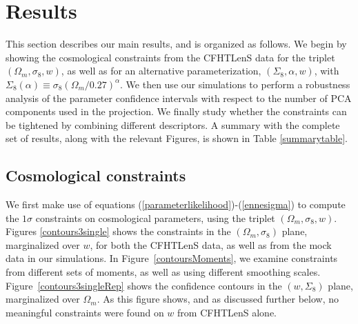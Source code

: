 \documentclass[reprint,aps,prd,superscriptaddress,showkeys,showpacs]{revtex4-1}
\begin{document}
\section{Results}
\label{results}

This section describes our main results, and is organized as follows.
We begin by showing the cosmological constraints from the CFHTLenS
data for the triplet $(\Omega_m,\sigma_8,w)$, as well as for an
alternative parameterization, $(\Sigma_8,\alpha,w)$, with
$\Sigma_8(\alpha)\equiv \sigma_8(\Omega_m/0.27)^\alpha$.  We then use
our simulations to perform a robustness analysis of the parameter
confidence intervals with respect to the number of PCA components used
in the projection.
We finally study whether the constraints can be tightened by combining
different descriptors. A summary with the complete set of results,
along with the relevant Figures, is shown in Table \ref{summarytable}.





\subsection{Cosmological constraints}
%
We first make use of equations
(\ref{parameterlikelihood})-(\ref{ennesigma}) to compute the $1\sigma$
constraints on cosmological parameters, using the triplet
$(\Omega_m,\sigma_8,w)$.  Figures \ref{contours3single} shows the
constraints in the $(\Omega_m,\sigma_8)$ plane, marginalized over $w$,
for both the CFHTLenS data, as well as from the mock data in our
simulations.  In Figure~\ref{contoursMoments}, we examine constraints
from different sets of moments, as well as using different smoothing
scales.  Figure~\ref{contours3singleRep} shows the confidence contours
in the $(w,\Sigma_8)$ plane, marginalized over $\Omega_m$. As this
figure shows, and as discussed further below, no meaningful
constraints were found on $w$ from CFHTLenS alone.
\end{document}
